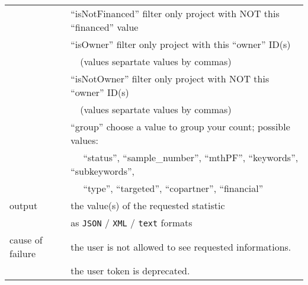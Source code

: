 \begin{tabular}{ | l | l | }
	\space & ``isNotFinanced'' filter only project with NOT this ``financed'' value \\
	\space & ``isOwner'' filter only project with this ``owner'' ID(s) \\	
	\space & ~~(values separtate values by commas) \\	
	\space & ``isNotOwner'' filter only project with NOT this ``owner'' ID(s) \\	
	\space & ~~(values separtate values by commas) \\	
	\space & ``group'' choose a value to group your count; possible values:  \\
	\space & ~~ ``status'', ``sample\_number'', ``mthPF'', ``keywords'', ``subkeywords'', \\
	\space & ~~ ``type'', ``targeted'', ``copartner'', ``financial'' \\
	\hline
	output & the value(s) of the requested statistic \\
	\space & as \texttt{JSON} / \texttt{XML} / \texttt{text} formats \\
	\hline
	cause of failure & the user is not allowed to see requested informations. \\
	\space & the user token is deprecated. \\
	\hline
\end{tabular}
\newline


